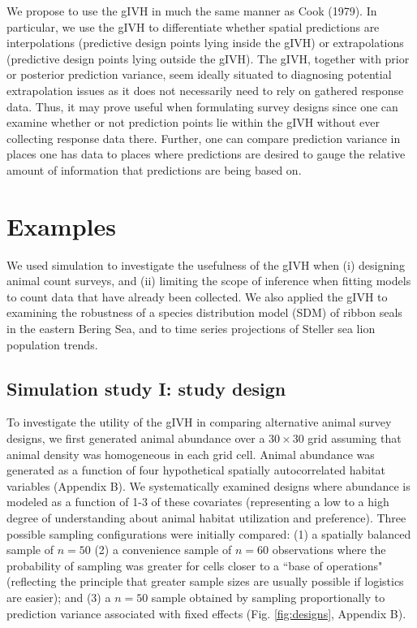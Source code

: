 \documentclass[12pt,english]{article}
\begin{document}
\begin{spacing}{1.9}
We propose to use the gIVH in much the same manner as Cook (1979).  In particular, we use the gIVH to differentiate whether spatial predictions are interpolations (predictive design points lying inside the gIVH) or extrapolations (predictive design points lying outside the gIVH).  The gIVH, together with prior or posterior prediction variance, seem ideally situated to diagnosing potential extrapolation issues as it does not necessarily need to rely on gathered response data. Thus, it may prove useful when formulating survey designs since one can examine whether or not prediction points lie within the gIVH without ever collecting response data there.  Further, one can compare prediction variance in places one has data to places where predictions are desired to gauge the relative amount of information that predictions are being based on.

\section{Examples}

We used simulation to investigate the usefulness of the gIVH when (i) designing animal count surveys, and (ii) limiting the scope of inference when fitting models to count data that have already been collected.  We also applied the gIVH to examining the robustness of a species distribution model (SDM) of ribbon seals in the eastern Bering Sea, and to time series projections of Steller sea lion population trends.

\subsection{Simulation study I: study design}

To investigate the utility of the gIVH in comparing alternative animal survey designs, we first generated animal abundance over a  $30 \times 30$ grid assuming that animal density was homogeneous in each grid cell.  Animal abundance was generated as a function of four hypothetical spatially autocorrelated habitat variables (Appendix B).  We systematically examined designs where abundance is modeled as a function of 1-3 of these covariates (representing a low to a high degree of understanding about animal habitat utilization and preference).  Three possible sampling configurations were initially compared: (1) a spatially balanced sample of $n=50$ \citep[using a random tesselation design][]{StevensOlsen2004} (2) a convenience sample of $n=60$ observations where the probability of sampling was greater for cells closer to a ``base of operations" (reflecting the principle that greater sample sizes are usually possible if logistics are easier); and (3) a $n=50$ sample obtained by sampling proportionally to prediction variance associated with fixed effects (Fig. \ref{fig:designs}, Appendix B).



\end{spacing}
\end{document}
